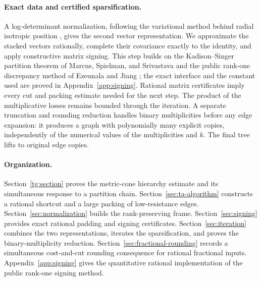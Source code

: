 \paragraph{Exact data and certified sparsification.}
A log-determinant normalization, following the variational method behind
radial isotropic position \cite[Section~2.2]{Barthe1998}, gives the second
vector representation. We approximate the stacked vectors rationally,
complete their covariance exactly to the identity, and apply constructive
matrix signing. This step builds on the Kadison--Singer partition theorem
of Marcus, Spielman, and Srivastava
\cite{MarcusSpielmanSrivastava2015} and the public rank-one discrepancy
method of Ezeunala and Jiang \cite{EzeunalaJiang2026}; the exact interface
and the constant used are proved in Appendix~\ref{app:signing}. Rational matrix
certificates imply every cut and packing estimate needed for the next
step. The product of the multiplicative losses remains bounded through
the iteration. A separate truncation and rounding reduction handles
binary multiplicities before any edge expansion: it produces a graph
with polynomially many explicit copies, independently of the numerical
values of the multiplicities and $k$. The final tree lifts to original
edge copies.

\paragraph{Organization.}
Section~\ref{tg:section} proves the metric-cone hierarchy estimate and
its simultaneous response to a partition chain. Section~\ref{sec:ta-algorithm}
constructs a rational shortcut and a large packing of low-resistance edges.
Section~\ref{sec:normalization} builds the rank-preserving frame.
Section~\ref{sec:signing} provides exact rational padding and signing
certificates. Section~\ref{sec:iteration} combines the two representations,
iterates the sparsification, and proves the binary-multiplicity reduction.
Section~\ref{sec:fractional-rounding} records a simultaneous cost-and-cut
rounding consequence for rational fractional inputs.
Appendix~\ref{app:signing} gives the quantitative rational implementation
of the public rank-one signing method.

